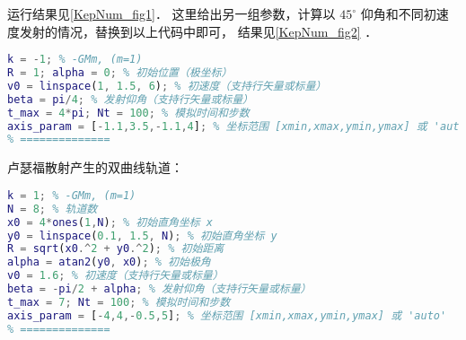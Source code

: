 运行结果见\autoref{KepNum_fig1}． 这里给出另一组参数，计算以 $45^\circ$ 仰角和不同初速度发射的情况，替换到以上代码中即可， 结果见\autoref{KepNum_fig2} ．
\begin{lstlisting}[language=matlab]
% === 参数设置 ===
k = -1; % -GMm, (m=1)
R = 1; alpha = 0; % 初始位置（极坐标）
v0 = linspace(1, 1.5, 6); % 初速度（支持行矢量或标量）
beta = pi/4; % 发射仰角（支持行矢量或标量）
t_max = 4*pi; Nt = 100; % 模拟时间和步数
axis_param = [-1.1,3.5,-1.1,4]; % 坐标范围 [xmin,xmax,ymin,ymax] 或 'auto'
% ==============
\end{lstlisting}

卢瑟福散射产生的双曲线轨道：
\begin{lstlisting}[language=matlab]
% === 参数设置 ===
k = 1; % -GMm, (m=1)
N = 8; % 轨道数
x0 = 4*ones(1,N); % 初始直角坐标 x
y0 = linspace(0.1, 1.5, N); % 初始直角坐标 y
R = sqrt(x0.^2 + y0.^2); % 初始距离
alpha = atan2(y0, x0); % 初始极角
v0 = 1.6; % 初速度（支持行矢量或标量）
beta = -pi/2 + alpha; % 发射仰角（支持行矢量或标量）
t_max = 7; Nt = 100; % 模拟时间和步数
axis_param = [-4,4,-0.5,5]; % 坐标范围 [xmin,xmax,ymin,ymax] 或 'auto'
% ==============
\end{lstlisting}
